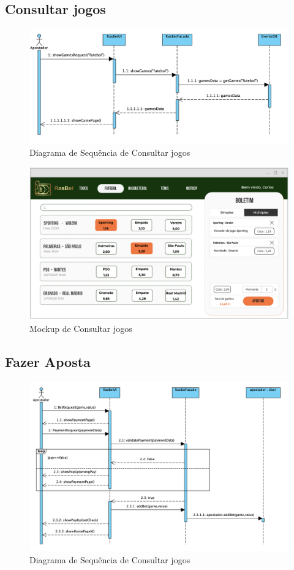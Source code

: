\subsection{Consultar jogos}
\begin{figure}[H]
\centering
\includegraphics[width=1\textwidth]{imagens/ambitoProduto/SConsultaJogo.png}
\caption{Diagrama de Sequência de Consultar jogos}
\end{figure}
\begin{figure}[H]
\centering
\includegraphics[width=1\textwidth]{imagens/ambitoProduto/Mockups/M_consultarJogos.png}
\caption{Mockup de Consultar jogos}
\end{figure}

\subsection{Fazer Aposta}
\begin{figure}[H]
\centering
\includegraphics[width=1\textwidth]{imagens/ambitoProduto/SFazerAposta.png}
\caption{Diagrama de Sequência de Consultar jogos}
\end{figure}

